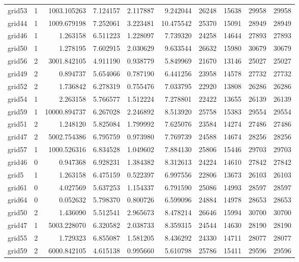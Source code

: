 \begin{longtable}{|l|r|r|r|r|r|r|r|r|r|}
grid53 & 1 & 1003.105263 & 7.124157 & 2.117887 & 9.242044 & 26248 & 15638 & 29958 & 29958 \\
grid44 & 1 & 1009.679198 & 7.252061 & 3.223481 & 10.475542 & 25370 & 15091 & 28949 & 28949 \\
grid46 & 1 & 1.263158 & 6.511223 & 1.228097 & 7.739320 & 24258 & 14644 & 27893 & 27893 \\
grid50 & 1 & 1.278195 & 7.602915 & 2.030629 & 9.633544 & 26632 & 15980 & 30679 & 30679 \\
grid56 & 2 & 3001.842105 & 4.911190 & 0.938779 & 5.849969 & 21670 & 13146 & 25027 & 25027 \\
grid49 & 2 & 0.894737 & 5.654066 & 0.787190 & 6.441256 & 23958 & 14578 & 27732 & 27732 \\
grid52 & 2 & 1.736842 & 6.278319 & 0.755476 & 7.033795 & 22920 & 13808 & 26286 & 26286 \\
grid54 & 1 & 2.263158 & 5.766577 & 1.512224 & 7.278801 & 22422 & 13655 & 26139 & 26139 \\
grid59 & 1 & 10000.894737 & 6.267028 & 2.246892 & 8.513920 & 25758 & 15383 & 29554 & 29554 \\
grid51 & 2 & 1.248120 & 5.825084 & 1.799992 & 7.625076 & 23584 & 14274 & 27486 & 27486 \\
grid47 & 2 & 5002.754386 & 6.795759 & 0.973980 & 7.769739 & 24588 & 14674 & 28256 & 28256 \\
grid57 & 1 & 1000.526316 & 6.834528 & 1.049602 & 7.884130 & 25806 & 15446 & 29703 & 29703 \\
grid46 & 0 & 0.947368 & 6.928231 & 1.384382 & 8.312613 & 24224 & 14610 & 27842 & 27842 \\
grid5 & 1 & 1.263158 & 6.475159 & 0.522397 & 6.997556 & 22806 & 13673 & 26103 & 26103 \\
grid61 & 0 & 4.027569 & 5.637253 & 1.154337 & 6.791590 & 25086 & 14993 & 28597 & 28597 \\
grid64 & 0 & 0.052632 & 5.798370 & 0.800726 & 6.599096 & 24884 & 14978 & 28653 & 28653 \\
grid50 & 2 & 1.436090 & 5.512541 & 2.965673 & 8.478214 & 26646 & 15994 & 30700 & 30700 \\
grid47 & 1 & 5003.228070 & 6.320582 & 2.038733 & 8.359315 & 24544 & 14630 & 28190 & 28190 \\
grid55 & 2 & 1.729323 & 6.855087 & 1.581205 & 8.436292 & 24330 & 14711 & 28077 & 28077 \\
grid59 & 2 & 6000.842105 & 4.615138 & 0.995660 & 5.610798 & 25786 & 15411 & 29596 & 29596 \\

\end{longtable}
